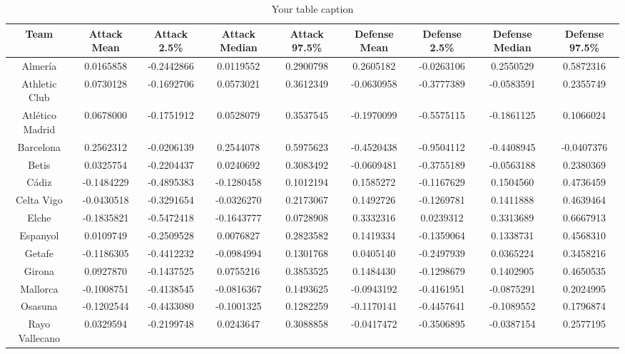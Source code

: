 \documentclass[
]{article}
\begin{document}
\begin{table}

\caption{\label{tab:example attack def table}Your table caption}
\centering
\begin{tabular}[t]{c|c|c|c|c|c|c|c|c}
\hline
Team & Attack Mean & Attack 2.5\% & Attack Median & Attack 97.5\% & Defense Mean & Defense 2.5\% & Defense Median & Defense 97.5\%\\
\hline
Almería & 0.0165858 & -0.2442866 & 0.0119552 & 0.2900798 & 0.2605182 & -0.0263106 & 0.2550529 & 0.5872316\\
\hline
Athletic Club & 0.0730128 & -0.1692706 & 0.0573021 & 0.3612349 & -0.0630958 & -0.3777389 & -0.0583591 & 0.2355749\\
\hline
Atlético Madrid & 0.0678000 & -0.1751912 & 0.0528079 & 0.3537545 & -0.1970099 & -0.5575115 & -0.1861125 & 0.1066024\\
\hline
Barcelona & 0.2562312 & -0.0206139 & 0.2544078 & 0.5975623 & -0.4520438 & -0.9504112 & -0.4408945 & -0.0407376\\
\hline
Betis & 0.0325754 & -0.2204437 & 0.0240692 & 0.3083492 & -0.0609481 & -0.3755189 & -0.0563188 & 0.2380369\\
\hline
Cádiz & -0.1484229 & -0.4895383 & -0.1280458 & 0.1012194 & 0.1585272 & -0.1167629 & 0.1504560 & 0.4736459\\
\hline
Celta Vigo & -0.0430518 & -0.3291654 & -0.0326270 & 0.2173067 & 0.1492726 & -0.1269781 & 0.1411888 & 0.4639464\\
\hline
Elche & -0.1835821 & -0.5472418 & -0.1643777 & 0.0728908 & 0.3332316 & 0.0239312 & 0.3313689 & 0.6667913\\
\hline
Espanyol & 0.0109749 & -0.2509528 & 0.0076827 & 0.2823582 & 0.1419334 & -0.1359064 & 0.1338731 & 0.4568310\\
\hline
Getafe & -0.1186305 & -0.4412232 & -0.0984994 & 0.1301768 & 0.0405140 & -0.2497939 & 0.0365224 & 0.3458216\\
\hline
Girona & 0.0927870 & -0.1437525 & 0.0755216 & 0.3853525 & 0.1484430 & -0.1298679 & 0.1402905 & 0.4650535\\
\hline
Mallorca & -0.1008751 & -0.4138545 & -0.0816367 & 0.1493625 & -0.0943192 & -0.4161951 & -0.0875291 & 0.2024995\\
\hline
Osasuna & -0.1202544 & -0.4433080 & -0.1001325 & 0.1282259 & -0.1170141 & -0.4457641 & -0.1089552 & 0.1796874\\
\hline
Rayo Vallecano & 0.0329594 & -0.2199748 & 0.0243647 & 0.3088858 & -0.0417472 & -0.3506895 & -0.0387154 & 0.2577195\\

\end{tabular}
\end{table}
\end{document}
